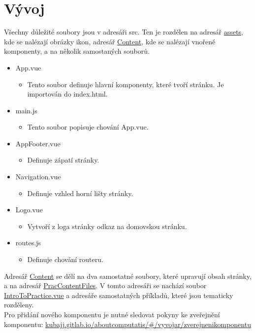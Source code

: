 \documentclass[
]{article}
\begin{document}
\section{Vývoj}
Všechny důležité soubory jsou v adresáři src. Ten je rozdělen na adresář \href{https://gitlab.com/kubajj/computatis/tree/master/src/assets}{assets}, kde se nalézají obrázky ikon,
adresář \href{https://gitlab.com/kubajj/computatis/tree/master/src/Content}{Content}, kde se nalézají vnořené komponenty, a na několik samostaných souborů.
\begin{itemize}
  \item App.vue
  \begin{itemize}
    \item Tento soubor definuje hlavní komponenty, které tvoří stránku. Je importován do index.html.
  \end{itemize}
  \item main.js  
  \begin{itemize}
    \item Tento soubor popisuje chování App.vue.
  \end{itemize}
  \item AppFooter.vue
  \begin{itemize}
    \item Definuje zápatí stránky.
  \end{itemize}
  \item Navigation.vue
  \begin{itemize}
    \item Definuje vzhled horní lišty stránky.
  \end{itemize}
  \item Logo.vue
  \begin{itemize}
    \item Vytvoří z loga stránky odkaz na domovskou stránku. 
  \end{itemize}
  \item routes.js
  \begin{itemize}
    \item Definuje chování routeru.
  \end{itemize}
\end{itemize}
Adresář \href{https://gitlab.com/kubajj/computatis/tree/master/src/Content}{Content} se dělí na dva samostatné soubory, které upravují obsah stránky, a na adresář 
\href{https://gitlab.com/kubajj/computatis/tree/master/src/Content/PracContentFiles}{PracContentFiles}. V tomto adresáři se nachází soubor 
\href{https://gitlab.com/kubajj/computatis/blob/master/src/Content/PracContentFiles/IntroToPractice.vue}{IntroToPractice.vue} a adresáře samostatných příkladů,
které jsou tematicky rozděleny.\\ Pro přidání nového komponentu je nutné sledovat pokyny ke zveřejnění komponentu:
\href{https://kubajj.gitlab.io/aboutcomputatis/#/vyvojar/zverejnenikomponentu}{kubajj.gitlab.io/aboutcomputatis/\#/vyvojar/zverejnenikomponentu}
\end{document}

